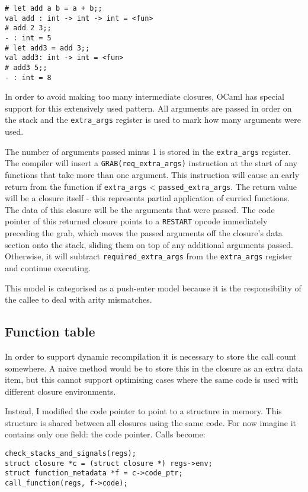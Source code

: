 \begin{verbatim}
# let add a b = a + b;;
val add : int -> int -> int = <fun>
# add 2 3;;
- : int = 5
# let add3 = add 3;;
val add3: int -> int = <fun>
# add3 5;;
- : int = 8
\end{verbatim}

In order to avoid making too many intermediate closures, OCaml has special support for this
extensively used pattern. All arguments are passed in order on the stack and the
\texttt{extra\_args}
register is used to mark how many arguments were used.

The number of arguments passed minus 1 is stored in the \texttt{extra\_args} register. The compiler
will insert a \texttt{GRAB(req\_extra\_args)} instruction at the start of any functions that take
more than one argument.  This instruction will cause an early return from the function if
\texttt{extra\_args} <
\texttt{passed\_extra\_args}. The return value will be a closure itself - this represents partial
application of curried functions. The data of this closure will be the arguments that were passed.
The code pointer of this returned closure points to a \texttt{RESTART} opcode immediately
preceding the grab, which moves the passed arguments off  the closure's data section onto the
stack, sliding them on top of any additional arguments passed.	Otherwise, it will subtract
\texttt{required\_extra\_args} from the \texttt{extra\_args} register
and continue executing.

This model is categorised as a push-enter model because it is the responsibility of the callee to
deal with arity mismatches.

\subsection{Function table}

In order to support dynamic recompilation it is necessary to store the call count somewhere. A
naive method would be to store this in the closure as an extra data item, but this cannot support
optimising cases where the same code is used with different closure environments.

Instead, I modified the code pointer to point to a structure in memory. This structure is shared
between all closures using the same code. For now imagine it contains only one field: the code
pointer. Calls become:

\begin{verbatim}
check_stacks_and_signals(regs);
struct closure *c = (struct closure *) regs->env;
struct function_metadata *f = c->code_ptr;
call_function(regs, f->code);
\end{verbatim}

